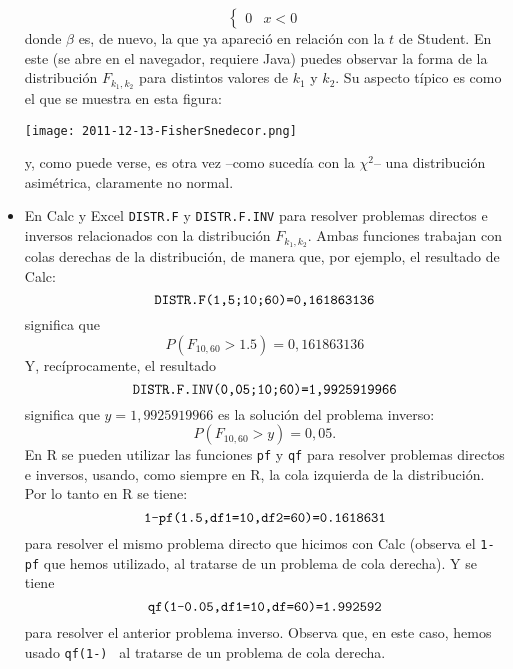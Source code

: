 \begin{itemize}
\[\begin{cases}
        0&x<0
        \end{cases}
        \]
        donde $\beta$ es, de nuevo, la  que ya apareció en relación con la $t$ de Student. En este  (se abre en el navegador, requiere Java) puedes observar la forma de la distribución $F_{k_1,k_2}$ para distintos valores de $k_1$ y $k_2$. Su aspecto típico es como el que se muestra en esta figura:
        \begin{center}
        \texttt{[image: 2011-12-13-FisherSnedecor.png]}
        \end{center}
        y, como puede verse, es otra vez --como sucedía con la $\chi^2$-- una distribución asimétrica, claramente no normal.


    \item En Calc y Excel  {\tt DISTR.F} y {\tt DISTR.F.INV} para resolver problemas directos e inversos relacionados con la distribución $F_{k_1,k_2}$. Ambas funciones trabajan con colas derechas de la distribución, de manera que, por ejemplo, el resultado de Calc:
        \[\mbox{\tt DISTR.F(1,5;10;60)=0,161863136}\]
        significa que
        \[P( F_{10,60}>1.5)=0,161863136\]
        Y, recíprocamente, el resultado
        \[\mbox{\tt DISTR.F.INV(0,05;10;60)=1,9925919966}\]
        significa que $y=1,9925919966$ es la solución del problema inverso:
        \[P( F_{10,60}>y)=0,05.\]
        En R se pueden utilizar las funciones {\tt pf} y {\tt qf} para resolver problemas directos e inversos, usando, como siempre en R, la cola izquierda de la distribución. Por lo tanto en R se tiene:
        \[\mbox{\tt 1-pf(1.5,df1=10,df2=60)=0.1618631}\]
        para resolver el mismo problema directo que hicimos con Calc (observa el {\tt 1-pf} que hemos utilizado, al tratarse de un problema de cola derecha). Y se tiene
        \[\mbox{\tt qf(1-0.05,df1=10,df=60)=1.992592}\]
        para resolver el anterior problema inverso. Observa que, en este caso, hemos usado {\tt qf(1-) } al tratarse de un problema de cola derecha.


\end{itemize}
